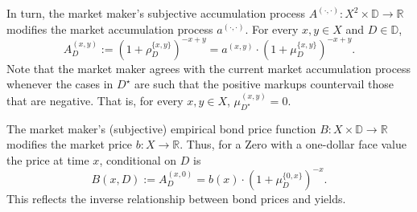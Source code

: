\documentclass[ecta,nameyear,draft]{econsocart}
\newcommand{\R}{\mathbb R}
\newcommand{\mbbd}{{\mathds D}}
\newcommand{\past}{{D^\star}}
\newcommand{\xy}{{(x, y)}}
\newcommand{\dd}{{(\cdot,\cdot)}}
\theoremstyle{plain}
\theoremstyle{remark}
\begin{document}
In turn, the market maker's subjective accumulation process ${A^{\dd}}: X^2
\times \mbbd \rightarrow \R$ modifies the market accumulation process
$a^{\dd}$. For every $x, y \in X$ and $D \in\mbbd$,
\begin{equation*}
  {A}^{\xy}_{D} := \left(1 + \rho^{\{x,y\}}_{D}\right)^{-x + y} = a^{\xy} \cdot
  \left(1 + \mu^{\{x, y\}}_{D}\right)^{-x + y}.
\end{equation*}
Note that the market maker agrees with the current market accumulation process
whenever the cases in $\past$ are such that the positive markups countervail
those that are negative. That is, for every $x, y \in X$, ${\mu}^{\xy}_{\past}
= 0$.

The market maker's (subjective) empirical bond price function $B : X \times
\mbbd \rightarrow \R$ modifies the market price $b: X \rightarrow \R$. Thus,
for a Zero with a one-dollar face value the price at time $x$, conditional on
$D$ is 
\begin{equation*} B(x,D) := {A}^{(x, 0)}_{D} =
  b(x) \cdot \left(1 + \mu^{\{0,x\}}_{D} \right)^{-x} .
\end{equation*}
This reflects the inverse relationship between bond prices and yields.  
\end{document}
